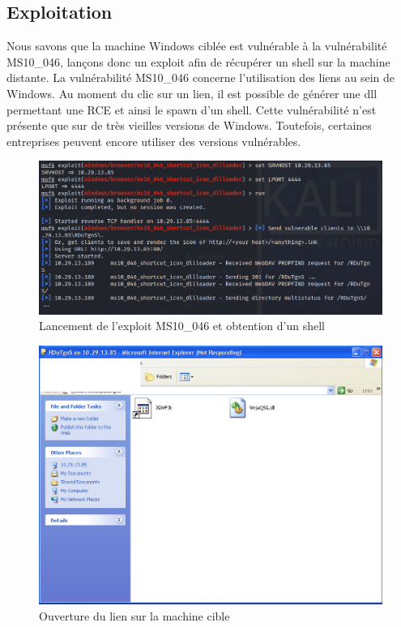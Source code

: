 \documentclass[12pt, oneside]{article}
\begin{document}
\subsection{Exploitation}
Nous savons que la machine Windows ciblée est vulnérable à la vulnérabilité MS10\_046, lançons donc un exploit afin de récupérer un shell sur la machine distante. La vulnérabilité MS10\_046 concerne l'utilisation des liens au sein de Windows. Au moment du clic sur un lien, il est possible de générer une dll permettant une RCE et ainsi le spawn d'un shell. Cette vulnérabilité n'est présente que sur de très vieilles versions de Windows. Toutefois, certaines entreprises peuvent encore utiliser des versions vulnérables.
\begin{figure}[H]
\centering
\includegraphics[scale=0.4]{msf}
\caption{Lancement de l'exploit MS10\_046 et obtention d'un shell}
\end{figure}
\begin{figure}[H]
\centering
\includegraphics[scale=0.4]{win2}
\caption{Ouverture du lien sur la machine cible}
\end{figure}
\end{document}
